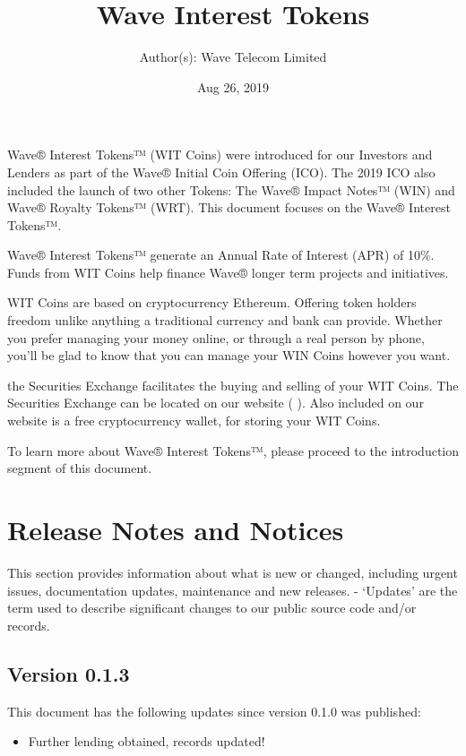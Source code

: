 \documentclass[letterpaper,10pt,openany,oneside,english]{sphinxmanual}
\title{Wave Interest Tokens}
\date{Aug 26, 2019}
\author{Author(s): Wave Telecom Limited}
\begin{document}
\maketitle
\sphinxtableofcontents
{}\label{\detokenize{index::doc}}


Wave® Interest Tokens™ (WIT Coins) were introduced for our Investors and Lenders as part of the Wave® Initial Coin Offering (ICO).
The 2019 ICO also included the launch of two other Tokens: The Wave® Impact Notes™ (WIN) and Wave® Royalty Tokens™ (WRT).
This document focuses on the Wave® Interest Tokens™.

Wave® Interest Tokens™ generate an Annual Rate of Interest (APR) of 10\%.
Funds from WIT Coins help finance Wave® longer term projects and initiatives.

WIT Coins are based on cryptocurrency Ethereum. Offering token holders freedom unlike anything a traditional currency and bank can provide.
Whether you prefer managing your money online, or through a real person by phone, you’ll be glad to know that you can manage your WIN Coins however you want.

the Securities Exchange facilitates the buying and selling of your WIT Coins.
The Securities Exchange can be located on our website (  ).
Also included on our website is a free cryptocurrency wallet, for storing your WIT Coins.

To learn more about Wave® Interest Tokens™, please proceed to the introduction segment of this document.


\chapter{Release Notes and Notices}
\label{\detokenize{releasenotes:release-notes-and-notices}}\label{\detokenize{releasenotes::doc}}
This section provides information about what is new or changed, including urgent issues, documentation updates, maintenance and new releases.
- ‘Updates’ are the term used to describe significant changes to our public source code and/or records.


\section{Version 0.1.3}
\label{\detokenize{releasenotes:version-0-1-3}}
This document has the following updates since version 0.1.0 was published:
\begin{itemize}
\item {} 
Further lending obtained, records updated!

\end{itemize}
\end{document}
